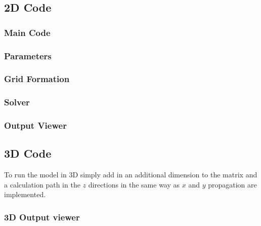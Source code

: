 \subsection{2D Code}
\label{appendix2D}
    \subsubsection{Main Code}
    \subsubsection{Parameters}
    \subsubsection{Grid Formation}
    \subsubsection{Solver}
    \subsubsection{Output Viewer}

\subsection{3D Code}
\label{appendix3D}
To run the model in 3D simply add in an additional dimension to the matrix and a calculation path in the $z$ directions in the same way as $x$ and $y$ propagation are implemented.
    \subsubsection{3D Output viewer}
